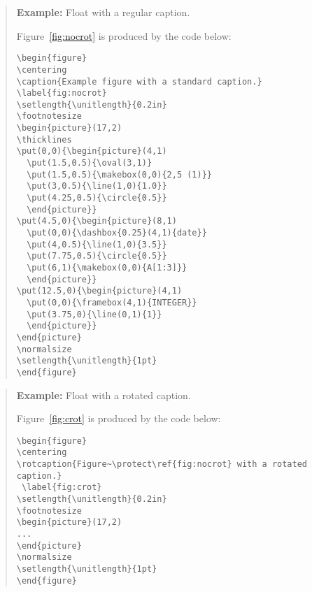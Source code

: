\documentclass[11pt]{article}
\newenvironment{example}{\begin{quotation}\small\textbf{Example: }}{\par\end{quotation}}
\begin{document}
\begin{example}Float with a regular caption.

Figure~\ref{fig:nocrot} is produced by the code below:
\begin{verbatim}
\begin{figure}
\centering
\caption{Example figure with a standard caption.} \label{fig:nocrot}
\setlength{\unitlength}{0.2in}
\footnotesize
\begin{picture}(17,2)
\thicklines
\put(0,0){\begin{picture}(4,1)
  \put(1.5,0.5){\oval(3,1)}
  \put(1.5,0.5){\makebox(0,0){2,5 (1)}}
  \put(3,0.5){\line(1,0){1.0}}
  \put(4.25,0.5){\circle{0.5}}
  \end{picture}}
\put(4.5,0){\begin{picture}(8,1)
  \put(0,0){\dashbox{0.25}(4,1){date}}
  \put(4,0.5){\line(1,0){3.5}}
  \put(7.75,0.5){\circle{0.5}}
  \put(6,1){\makebox(0,0){A[1:3]}}
  \end{picture}}
\put(12.5,0){\begin{picture}(4,1)
  \put(0,0){\framebox(4,1){INTEGER}}
  \put(3.75,0){\line(0,1){1}}
  \end{picture}}
\end{picture}
\normalsize
\setlength{\unitlength}{1pt}
\end{figure}
\end{verbatim}
\end{example} %

\begin{example}Float with a rotated caption.

Figure~\ref{fig:crot} is produced by the code below:
\begin{verbatim}
\begin{figure}
\centering
\rotcaption{Figure~\protect\ref{fig:nocrot} with a rotated caption.}
 \label{fig:crot}
\setlength{\unitlength}{0.2in}
\footnotesize
\begin{picture}(17,2)
...
\end{picture}
\normalsize
\setlength{\unitlength}{1pt}
\end{figure}
\end{verbatim}
\end{example} %
\end{document}
